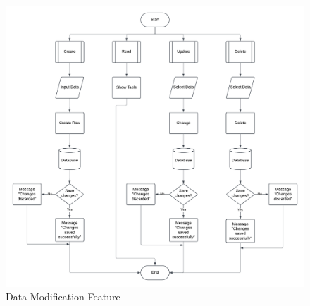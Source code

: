 \begin{appendices}
\begin{centerappendixtitle}
		\begin{figure}[h]
			\centering
			\caption{Data Modification Feature}
			\label{dataModifFlow}
			\includegraphics[width=\textwidth,height=\textheight,keepaspectratio]{appendix/data modif f}
		\end{figure}
		

\end{centerappendixtitle}
\end{appendices}
